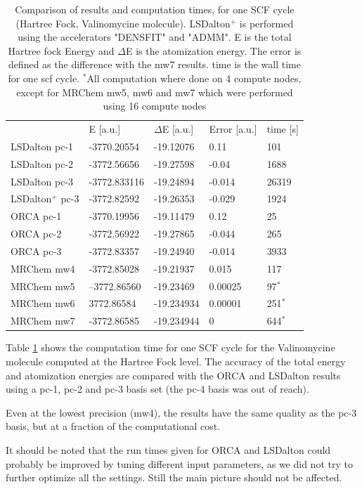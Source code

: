 \documentclass{article}
\begin{document}
\begin{table}[t]
    \centering
    \begin{tabular}{lllll}
     & E [a.u.] &$\Delta$E [a.u.]& Error [a.u.] & time [s]\\
    LSDalton pc-1 &-3770.20554&-19.12076&0.11&101\\
    LSDalton pc-2 &-3772.56656&-19.27598&-0.04&1688\\
    LSDalton pc-3 &-3772.833116&-19.24894&-0.014&26319\\
    LSDalton$^+$ pc-3 &-3772.82592&-19.26353&-0.029&1924\\
    ORCA pc-1 &-3770.19956&-19.11479&0.12&25\\
    ORCA pc-2 &-3772.56922&-19.27865&-0.044&265\\
    ORCA pc-3 &-3772.83357&-19.24940&-0.014&3933\\
    MRChem mw4&-3772.85028&-19.21937&0.015&117\\
    MRChem mw5&--3772.86560&-19.23469&0.00025& 97$^*$\\
    MRChem mw6&3772.86584&-19.234934&0.00001&251$^*$\\
    MRChem mw7&-3772.86585&-19.234944&0&644$^*$\\
       \end{tabular}    
    \caption{Comparison of results and computation times, for one SCF cycle (Hartree Fock, Valinomycine molecule). LSDalton$^+$ is performed using the accelerators "DENSFIT" and "ADMM". E is the total Hartree fock Energy and $\Delta$E is the atomization energy. The error is defined as the difference with the mw7 results. time is the wall time for one scf cycle. $^*$All computation where done on 4 compute nodes, except for MRChem mw5, mw6 and mw7 which were performed using 16 compute nodes}
        \label{tab:MRC_ORCA_LSD}
\end{table}

Table \ref{tab:MRC_ORCA_LSD} shows the computation time for one SCF cycle for the Valinomycine molecule computed at the Hartree Fock level. The accuracy of the total energy and atomization energies are compared with the ORCA and LSDalton
results using a pc-1, pc-2 and pc-3 basis set (the pc-4 basis was out of reach). 

Even at the lowest precision (mw4), the results have the same quality as the pc-3 basis, but at a fraction of the computational cost. 

It should be noted that the run times given for ORCA\cite{orca} and LSDalton\cite{lsdalton} could probably be improved by tuning different input parameters, as we did not try to further optimize all the settings. Still the main picture should not be affected.
\end{document}
